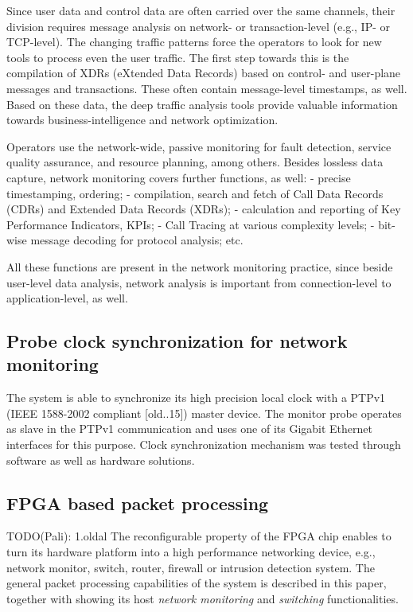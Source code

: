\documentclass[journal]{IEEEtran}
\begin{document}
Since user data and control data are often carried over the same channels, their division requires message analysis on network- or transaction-level (e.g., IP- or TCP-level). The changing traffic patterns force the operators to look for new tools to process even the user traffic. The first step towards this is the compilation of XDRs (eXtended Data Records) based on control- and user-plane messages and transactions. These often contain message-level timestamps, as well. Based on these data, the deep traffic analysis tools provide valuable information towards business-intelligence and network optimization. 

Operators use the network-wide, passive monitoring for fault detection, service quality assurance, and resource planning, among others. Besides lossless data capture, network monitoring covers further functions, as well:
- precise timestamping, ordering;
- compilation, search and fetch of Call Data Records (CDRs) and Extended Data Records (XDRs);
- calculation and reporting of Key Performance Indicators, KPIs;
- Call Tracing at various complexity levels;
-  bit-wise message decoding for protocol analysis; etc. 

All these functions are present in the network monitoring practice, since beside user-level data analysis, network analysis is important from connection-level to application-level, as well.

\subsection{Probe clock synchronization for network monitoring}

The system is able to synchronize its high precision local clock with a PTPv1 (IEEE 1588-2002 compliant [old..15]) master device. The monitor probe operates as slave in the PTPv1 communication and uses one of its Gigabit Ethernet interfaces for this purpose. Clock synchronization mechanism was tested through software as well as hardware solutions.

\subsection{FPGA based packet processing}
 TODO(Pali): 1.oldal
The reconfigurable property of the FPGA chip enables to turn its hardware platform into a high performance networking device, e.g., network monitor, switch, router, firewall or intrusion detection system. The general packet processing capabilities of the system is described in this paper, together with showing its host \emph{network monitoring} and \emph{switching} functionalities.
\end{document}
